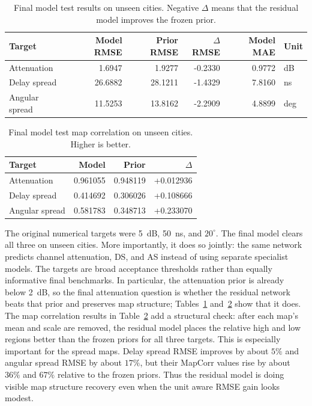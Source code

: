 \documentclass[journal]{IEEEtran}
\begin{document}
\begin{table}[!t]
\centering
\caption{Final model test results on unseen cities. Negative \(\Delta\) means
that the residual model improves the frozen prior.}
\label{tab:main-results}
\scriptsize
\setlength{\tabcolsep}{4pt}
\begin{tabular}{lrrrrl}
\toprule
Target & Model RMSE & Prior RMSE & \(\Delta\)RMSE & Model MAE & Unit \\
\midrule
Attenuation & 1.6947 & 1.9277 & -0.2330 & 0.9772 & dB \\
Delay spread & 26.6882 & 28.1211 & -1.4329 & 7.8160 & ns \\
Angular spread & 11.5253 & 13.8162 & -2.2909 & 4.8899 & deg \\
\bottomrule
\end{tabular}
\end{table}

\begin{table}[!t]
\centering
\caption{Final model test map correlation on unseen cities. Higher is better.}
\label{tab:mapcorr}
\scriptsize
\setlength{\tabcolsep}{4pt}
\begin{tabular}{lrrr}
\toprule
Target & Model & Prior & \(\Delta\) \\
\midrule
Attenuation & 0.961055 & 0.948119 & +0.012936 \\
Delay spread & 0.414692 & 0.306026 & +0.108666 \\
Angular spread & 0.581783 & 0.348713 & +0.233070 \\
\bottomrule
\end{tabular}
\end{table}

The original numerical targets were \SI{5}{dB}, \SI{50}{ns}, and
\(20^\circ\). The final model clears all three on unseen cities. More
importantly, it does so jointly: the same network predicts channel attenuation,
DS, and AS instead of
using separate specialist models.
The targets are broad acceptance thresholds rather than equally informative
final benchmarks. In particular, the attenuation prior is already below
\SI{2}{dB}, so the final attenuation question is whether the residual network
beats that prior and preserves map structure; Tables~\ref{tab:main-results}
and~\ref{tab:mapcorr} show that it does.
The map correlation results in Table~\ref{tab:mapcorr} add a structural check:
after each map's mean and scale are removed, the residual model places the
relative high and low regions better than the frozen priors for all three
targets. This is especially important for the spread maps. Delay spread RMSE
improves by about \(5\%\) and angular spread RMSE by about \(17\%\), but their
MapCorr values rise by about \(36\%\) and \(67\%\) relative to the frozen priors.
Thus the residual model is doing visible map structure recovery even when the
unit aware RMSE gain looks modest.
\end{document}
